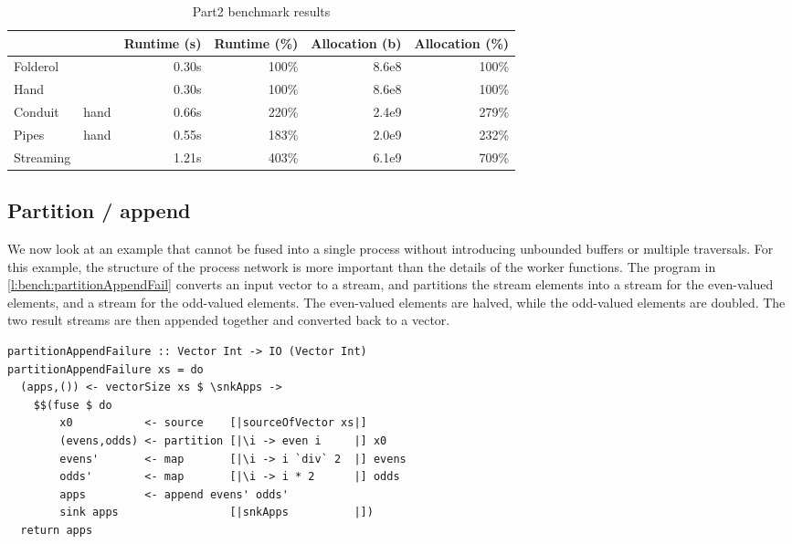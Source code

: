 \begin{table}
\begin{center}
\begin{tabular}{ll|rrrr}
& & Runtime (s)  & Runtime (\%) & Allocation (b) & Allocation (\%) \\
\hline
Folderol &          & 0.30s &   100\% & 8.6e8 & 100\% \\
Hand     &          & 0.30s &   100\% & 8.6e8 & 100\% \\
Conduit & hand      & 0.66s &   220\% & 2.4e9 & 279\% \\
Pipes  & hand       & 0.55s &   183\% & 2.0e9 & 232\% \\
Streaming &         & 1.21s &   403\% & 6.1e9 & 709\% \\
\end{tabular}
\end{center}
\caption[Part2 benchmark results]{Part2 benchmark results}
\label{table:bench:part2}
\end{table}


\subsection{Partition / append}
\label{s:Benchmarks:partitionAppend}

We now look at an example that cannot be fused into a single process without introducing unbounded buffers or multiple traversals.
For this example, the structure of the process network is more important than the details of the worker functions.
The program in \cref{l:bench:partitionAppendFail} converts an input vector to a stream, and partitions the stream elements into a stream for the even-valued elements, and a stream for the odd-valued elements.
The even-valued elements are halved, while the odd-valued elements are doubled.
The two result streams are then appended together and converted back to a vector.

\begin{lstlisting}[float,label=l:bench:partitionAppendFail,caption=Partition / append fusion failure]
partitionAppendFailure :: Vector Int -> IO (Vector Int)
partitionAppendFailure xs = do
  (apps,()) <- vectorSize xs $ \snkApps ->
    $$(fuse $ do
        x0           <- source    [|sourceOfVector xs|]
        (evens,odds) <- partition [|\i -> even i     |] x0
        evens'       <- map       [|\i -> i `div` 2  |] evens
        odds'        <- map       [|\i -> i * 2      |] odds
        apps         <- append evens' odds'
        sink apps                 [|snkApps          |])
  return apps
\end{lstlisting}


